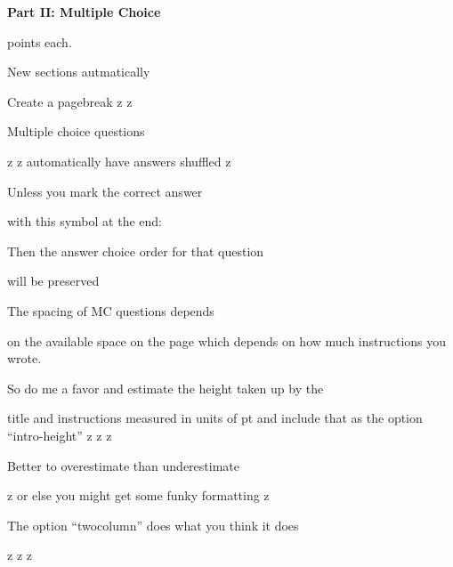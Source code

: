 \documentclass{exam}
\begin{document}
\newpage
\par\noindent \textbf{\large  Part II: Multiple Choice}
\par{} points each.
\setlength{\columnsep}{0.40 in}
\begin{multicols*}{2}
\renewcommand{\choiceshook}{\setlength{\leftmargin}{0.40 in}}
\renewcommand{\questionshook}{\setlength{\leftmargin}{0.0 in}}
\begin{questions}
\setcounter{question}{12}
	\question New sections autmatically
	\begin{choices}
		\CorrectChoice Create a pagebreak
		\choice z
		\choice z
	\end{choices}
	\question Multiple choice questions
	\begin{choices}
		\choice z
		\choice z
		\CorrectChoice automatically have answers shuffled
		\choice z
	\end{choices}
	\question Unless you mark the correct answer
	\begin{choices}
		\CorrectChoice with this symbol at the end:
		\choice 1
		\choice 2
		\choice 3
	\end{choices}
	\question Then the answer choice order for that question
	\begin{choices}
		\choice will
		\choice be
		\CorrectChoice preserved
	\end{choices}
	\question The spacing of MC questions depends
	\begin{choices}
		\choice on the available space on the page
		\CorrectChoice which depends on how much instructions you wrote.
	\end{choices}
	\question So do me a favor and estimate the height taken up by the
	\begin{choices}
		\choice title and instructions
		\CorrectChoice measured in units of pt
		\choice and include that as the option ``intro-height''
		\choice z
		\choice z
		\choice z
	\end{choices}
	\question Better to overestimate than underestimate
	\begin{choices}
		\choice z
		\CorrectChoice or else you might get some funky formatting
		\choice z
	\end{choices}
	\vfill\null\columnbreak
	\question The option ``twocolumn'' does what you think it does
	\begin{choices}
		\CorrectChoice z
		\CorrectChoice z
		\CorrectChoice z
	\end{choices}
\end{questions}
\end{multicols*}
\renewcommand{\choiceshook}{}
\renewcommand{\questionshook}{}
\end{document}
